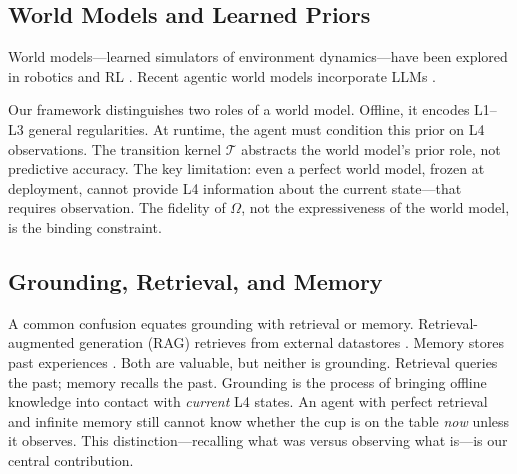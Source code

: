 
\subsection{World Models and Learned Priors}

World models---learned simulators of environment dynamics---have been explored in robotics and RL \citep{ha2018world,lecun2022pathways,schmidhuber1990making}. Recent agentic world models incorporate LLMs \citep{zhang2024agentic,ren2026aligning}.

Our framework distinguishes two roles of a world model. Offline, it encodes L1--L3 general regularities. At runtime, the agent must condition this prior on L4 observations. The transition kernel \(\mathcal{T}\) abstracts the world model's prior role, not predictive accuracy. The key limitation: even a perfect world model, frozen at deployment, cannot provide L4 information about the current state---that requires observation. The fidelity of \(\Omega\), not the expressiveness of the world model, is the binding constraint.


\subsection{Grounding, Retrieval, and Memory}

A common confusion equates grounding with retrieval or memory. Retrieval-augmented generation (RAG) retrieves from external datastores \citep{lewis2020retrieval,gao2023retrieval}. Memory stores past experiences \citep{zhong2024memory}. Both are valuable, but neither is grounding. Retrieval queries the past; memory recalls the past. Grounding is the process of bringing offline knowledge into contact with \emph{current} L4 states. An agent with perfect retrieval and infinite memory still cannot know whether the cup is on the table \emph{now} unless it observes. This distinction---recalling what was versus observing what is---is our central contribution.

